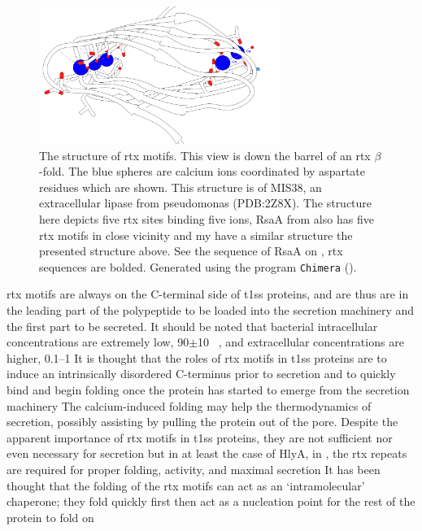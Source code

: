   \begin{figure}[htb]
    \begin{center}
      \includegraphics[width=0.7\textwidth]{intro/img/rtx-white.png}
    \end{center}
    \caption[The structure of \ac{rtx} motifs]{The structure of \ac{rtx} motifs. This view is down the barrel of an \ac{rtx} $\beta$-fold. The blue spheres are calcium ions coordinated by aspartate residues which are shown. This structure is of MIS38, an extracellular lipase from \ac{pseudomonas} (PDB:2Z8X). The structure here depicts five \ac{rtx} sites binding five  ions, RsaA from \caulobacter also has five \ac{rtx} motifs in close vicinity and my have a similar structure the presented structure above. See the sequence of RsaA on , \ac{rtx} sequences are bolded. Generated using the program \texttt{Chimera} ().
    }
    \label{fig:intro-rtx}
  \end{figure}   

  \ac{rtx} motifs are always on the C-terminal side of \ac{t1ss} proteins, and are thus are in the leading part of the polypeptide to be loaded into the secretion machinery and the first part to be secreted. It should be noted that bacterial intracellular  concentrations are extremely low, 90$\pm$10 \si{\nano\molar}, and extracellular  concentrations are higher, 0.1--1 \millimolar{} It is thought that the roles of \ac{rtx} motifs in \ac{t1ss} proteins are to induce an intrinsically disordered C-terminus prior to secretion and to quickly  bind  and begin folding once the protein has started to emerge from the secretion machinery The calcium-induced folding may help the thermodynamics of secretion, possibly assisting by pulling the protein out of the pore.  Despite the apparent importance of \ac{rtx} motifs in \ac{t1ss} proteins, they are not sufficient nor even necessary for secretion but in at least the case of HlyA, in \ecoli, the \ac{rtx} repeats are required for proper folding, activity, and maximal secretion It has been thought that the folding of the \ac{rtx} motifs can act as an `intramolecular' chaperone; they fold quickly first then act as a nucleation point for the rest of the protein to fold on 
 
